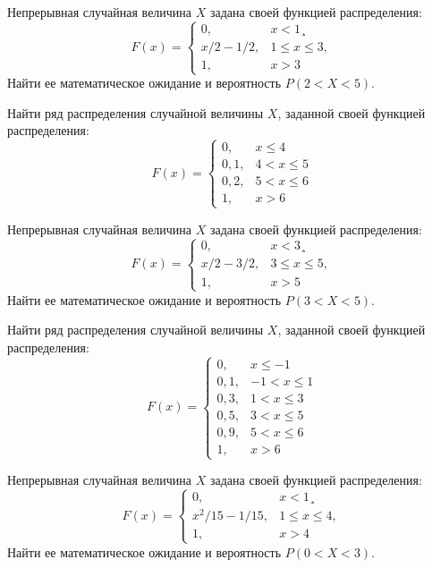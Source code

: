\vfill

\z Непрерывная случайная величина $X$ задана своей функцией распределения: $$ F(x) = \begin{cases}0, & x < 1¸\\ x/2-1/2, & 1 \leqslant x \leqslant 3, \\ 1, & x > 3 \end{cases} $$ Найти ее математическое ожидание и вероятность $P(2 < X < 5)$.
 

\vfill

\newpage\setcounter{zad}{0}

\z Найти ряд распределения случайной величины $X$, заданной своей функцией распределения: $$ F(x) = \begin{cases}0, & x \leqslant 4 \\ 0{,}1, & 4 < x \leqslant 5 \\ 0{,}2, & 5 < x \leqslant 6 \\ 1, & x > 6 \end{cases} $$


\vfill

\z Непрерывная случайная величина $X$ задана своей функцией распределения: $$ F(x) = \begin{cases}0, & x < 3¸\\ x/2-3/2, & 3 \leqslant x \leqslant 5, \\ 1, & x > 5 \end{cases} $$ Найти ее математическое ожидание и вероятность $P(3 < X < 5)$.
 

\vfill

\newpage\setcounter{zad}{0}

\z Найти ряд распределения случайной величины $X$, заданной своей функцией распределения: $$ F(x) = \begin{cases}0, & x \leqslant -1 \\ 0{,}1, & -1 < x \leqslant 1 \\ 0{,}3, & 1 < x \leqslant 3 \\ 0{,}5, & 3 < x \leqslant 5 \\ 0{,}9, & 5 < x \leqslant 6 \\ 1, & x > 6 \end{cases} $$


\vfill

\z Непрерывная случайная величина $X$ задана своей функцией распределения: $$ F(x) = \begin{cases}0, & x < 1¸\\ x^2/15-1/15, & 1 \leqslant x \leqslant 4, \\ 1, & x > 4 \end{cases} $$ Найти ее математическое ожидание и вероятность $P(0 < X < 3)$.
 

